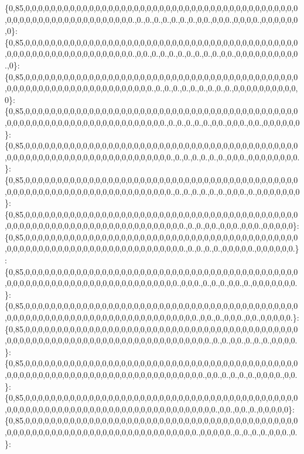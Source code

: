 \{0,85,0,0,0,0,0,0,0,0,0,0,0,0,0,0,0,0,0,0,0,0,0,0,0,0,0,0,0,0,0,0,0,0,0,0,0,0,0,0,0,0,0,0,0,0,0,0,0,0,0,0,0,0,0,0,0,0,0,0,0,0,0,0,0.,0.,0.,0.,0.,0.,0.,0.,0,0.,0,0,0.,0,0,0,0.,0,0,0,0,0,0,0\}\+: \{0,85,0,0,0,0,0,0,0,0,0,0,0,0,0,0,0,0,0,0,0,0,0,0,0,0,0,0,0,0,0,0,0,0,0,0,0,0,0,0,0,0,0,0,0,0,0,0,0,0,0,0,0,0,0,0,0,0,0,0,0,0,0,0,0.,0,0.,0.,0.,0.,0.,0.,0.,0.,0.,0,0.,0,0,0,0,0,0,0,0,0,0.,0\}\+: \{0,85,0,0,0,0,0,0,0,0,0,0,0,0,0,0,0,0,0,0,0,0,0,0,0,0,0,0,0,0,0,0,0,0,0,0,0,0,0,0,0,0,0,0,0,0,0,0,0,0,0,0,0,0,0,0,0,0,0,0,0,0,0,0,0,0,0,0.,0.,0.,0.,0.,0.,0.,0.,0.,0.,0,0,0,0,0,0,0,0,0,0,0\}\+: \{0,85,0,0,0,0,0,0,0,0,0,0,0,0,0,0,0,0,0,0,0,0,0,0,0,0,0,0,0,0,0,0,0,0,0,0,0,0,0,0,0,0,0,0,0,0,0,0,0,0,0,0,0,0,0,0,0,0,0,0,0,0,0,0,0,0,0,0,0,0.,0.,0.,0.,0.,0.,0,0.,0,0,0.,0,0.,0,0,0,0,0,0\}\+: \{0,85,0,0,0,0,0,0,0,0,0,0,0,0,0,0,0,0,0,0,0,0,0,0,0,0,0,0,0,0,0,0,0,0,0,0,0,0,0,0,0,0,0,0,0,0,0,0,0,0,0,0,0,0,0,0,0,0,0,0,0,0,0,0,0,0,0,0,0,0,0.,0.,0.,0.,0.,0.,0.,0,0,0.,0,0,0,0,0,0,0,0.\}\+: \{0,85,0,0,0,0,0,0,0,0,0,0,0,0,0,0,0,0,0,0,0,0,0,0,0,0,0,0,0,0,0,0,0,0,0,0,0,0,0,0,0,0,0,0,0,0,0,0,0,0,0,0,0,0,0,0,0,0,0,0,0,0,0,0,0,0,0,0,0,0,0.,0.,0.,0.,0.,0.,0.,0,0,0.,0.,0,0,0,0,0,0,0\}\+: \{0,85,0,0,0,0,0,0,0,0,0,0,0,0,0,0,0,0,0,0,0,0,0,0,0,0,0,0,0,0,0,0,0,0,0,0,0,0,0,0,0,0,0,0,0,0,0,0,0,0,0,0,0,0,0,0,0,0,0,0,0,0,0,0,0,0,0,0,0,0,0,0,0.,0.,0.,0,0.,0,0,0.,0,0,0.,0,0,0,0,0\}\+: \{0,85,0,0,0,0,0,0,0,0,0,0,0,0,0,0,0,0,0,0,0,0,0,0,0,0,0,0,0,0,0,0,0,0,0,0,0,0,0,0,0,0,0,0,0,0,0,0,0,0,0,0,0,0,0,0,0,0,0,0,0,0,0,0,0,0,0,0,0,0,0,0,0.,0.,0.,0.,0.,0,0,0,0,0.,0,0,0,0,0,0.\}\+: \{0,85,0,0,0,0,0,0,0,0,0,0,0,0,0,0,0,0,0,0,0,0,0,0,0,0,0,0,0,0,0,0,0,0,0,0,0,0,0,0,0,0,0,0,0,0,0,0,0,0,0,0,0,0,0,0,0,0,0,0,0,0,0,0,0,0,0,0,0,0,0,0.,0,0,0.,0.,0.,0.,0,0.,0.,0,0,0,0,0,0,0.\}\+: \{0,85,0,0,0,0,0,0,0,0,0,0,0,0,0,0,0,0,0,0,0,0,0,0,0,0,0,0,0,0,0,0,0,0,0,0,0,0,0,0,0,0,0,0,0,0,0,0,0,0,0,0,0,0,0,0,0,0,0,0,0,0,0,0,0,0,0,0,0,0,0,0,0,0,0.,0,0.,0.,0,0,0.,0,0.,0,0,0,0,0.\}\+: \{0,85,0,0,0,0,0,0,0,0,0,0,0,0,0,0,0,0,0,0,0,0,0,0,0,0,0,0,0,0,0,0,0,0,0,0,0,0,0,0,0,0,0,0,0,0,0,0,0,0,0,0,0,0,0,0,0,0,0,0,0,0,0,0,0,0,0,0,0,0,0,0,0,0,0,0,0.,0.,0.,0,0.,0.,0.,0.,0,0,0,0.\}\+: \{0,85,0,0,0,0,0,0,0,0,0,0,0,0,0,0,0,0,0,0,0,0,0,0,0,0,0,0,0,0,0,0,0,0,0,0,0,0,0,0,0,0,0,0,0,0,0,0,0,0,0,0,0,0,0,0,0,0,0,0,0,0,0,0,0,0,0,0,0,0,0,0,0,0,0,0.,0,0.,0.,0.,0.,0.,0,0,0,0.,0,0.\}\+: \{0,85,0,0,0,0,0,0,0,0,0,0,0,0,0,0,0,0,0,0,0,0,0,0,0,0,0,0,0,0,0,0,0,0,0,0,0,0,0,0,0,0,0,0,0,0,0,0,0,0,0,0,0,0,0,0,0,0,0,0,0,0,0,0,0,0,0,0,0,0,0,0,0,0,0,0,0,0.,0,0.,0,0.,0.,0,0,0,0,0\}\+: \{0,85,0,0,0,0,0,0,0,0,0,0,0,0,0,0,0,0,0,0,0,0,0,0,0,0,0,0,0,0,0,0,0,0,0,0,0,0,0,0,0,0,0,0,0,0,0,0,0,0,0,0,0,0,0,0,0,0,0,0,0,0,0,0,0,0,0,0,0,0,0,0,0,0,0.,0,0,0,0,0.,0.,0.,0.,0.,0,0,0.,0.\}\+: 